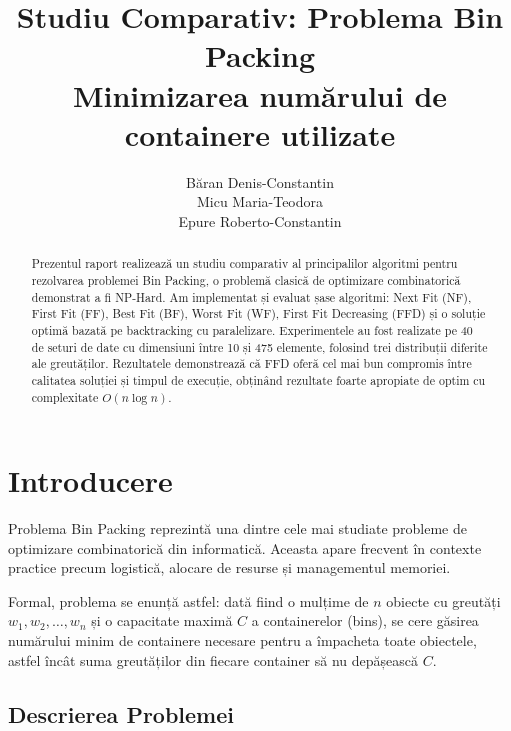 \documentclass[runningheads]{llncs}
\begin{document}
\title{Studiu Comparativ: Problema Bin Packing\\
\large Minimizarea numărului de containere utilizate}
\author{Băran Denis-Constantin\\ Micu Maria-Teodora\\ Epure Roberto-Constantin}
\maketitle

\begin{abstract}
Prezentul raport realizează un studiu comparativ al principalilor algoritmi pentru rezolvarea problemei Bin Packing, o problemă clasică de optimizare combinatorică demonstrat a fi NP-Hard. Am implementat și evaluat șase algoritmi: Next Fit (NF), First Fit (FF), Best Fit (BF), Worst Fit (WF), First Fit Decreasing (FFD) și o soluție optimă bazată pe backtracking cu paralelizare. Experimentele au fost realizate pe 40 de seturi de date cu dimensiuni între 10 și 475 elemente, folosind trei distribuții diferite ale greutăților. Rezultatele demonstrează că FFD oferă cel mai bun compromis între calitatea soluției și timpul de execuție, obținând rezultate foarte apropiate de optim cu complexitate $O(n \log n)$.
\end{abstract}

\section{Introducere}

Problema Bin Packing reprezintă una dintre cele mai studiate probleme de optimizare combinatorică din informatică. Aceasta apare frecvent în contexte practice precum logistică, alocare de resurse și managementul memoriei.

Formal, problema se enunță astfel: dată fiind o mulțime de $n$ obiecte cu greutăți $w_1, w_2, \ldots, w_n$ și o capacitate maximă $C$ a containerelor (bins), se cere găsirea numărului minim de containere necesare pentru a împacheta toate obiectele, astfel încât suma greutăților din fiecare container să nu depășească $C$.

\subsection{Descrierea Problemei}
\end{document}

